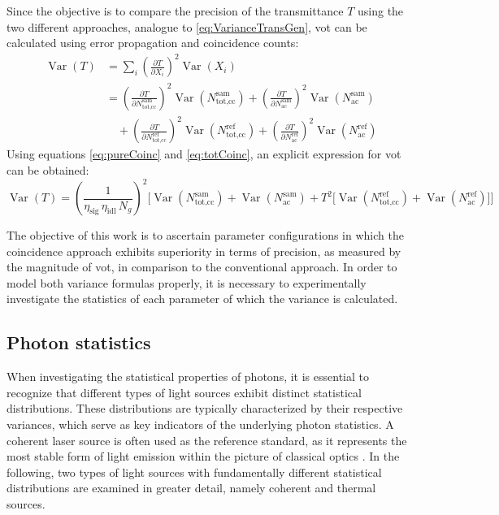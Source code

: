 Since the objective is to compare the precision of the transmittance $T$ using the two different approaches, analogue to \autoref{eq:VarianceTransGen}, \acrshort{vot} can be calculated using error propagation and coincidence counts:
\begin{equation}
	\begin{aligned}
		\operatorname{Var}(T) 
		&= \sum_{i} \left( \frac{\partial T}{\partial X_i} \right)^{2} 
		\operatorname{Var}\!\left(X_i\right) \\[0.5em]
		&= \left( \frac{\partial T}{\partial N_{\text{tot,cc}}^{\text{sam}}} \right)^{2} 
		\operatorname{Var}\!\left(N_{\text{tot,cc}}^{\text{sam}}\right)
		+ \left( \frac{\partial T}{\partial N_{\text{ac}}^{\text{sam}}} \right)^{2} 
		\operatorname{Var}\!\left(N_{\text{ac}}^{\text{sam}}\right) \\[0.5em]
		&\quad + \left( \frac{\partial T}{\partial N_{\text{tot,cc}}^{\text{ref}}} \right)^{2} 
		\operatorname{Var}\!\left(N_{\text{tot,cc}}^{\text{ref}}\right)
		+ \left( \frac{\partial T}{\partial N_{\text{ac}}^{\text{ref}}} \right)^{2} 
		\operatorname{Var}\!\left(N_{\text{ac}}^{\text{ref}}\right)
	\end{aligned}
	\label{eq:VarianceTransGenCoinc}
\end{equation}
Using equations \ref{eq:pureCoinc} and \ref{eq:totCoinc}, an explicit expression for \acrshort{vot} can be obtained:
 \begin{equation}
 	\operatorname{Var}(T) 
 	= \left( \frac{1}{\eta_{\text{sig}}\,\eta_{\text{idl}}\,N_g} \right)^{2}
 	\Bigg[
 	\operatorname{Var}\!\left(N_{\text{tot,cc}}^{\text{sam}}\right) 
 	+ \operatorname{Var}\!\left(N_{\text{ac}}^{\text{sam}}\right) 
 	+ T^{2} \Big[ 
 	\operatorname{Var}\!\left(N_{\text{tot,cc}}^{\text{ref}}\right) 
 	+ \operatorname{Var}\!\left(N_{\text{ac}}^{\text{ref}}\right) 
 	\Big]
 	\Bigg]
 	\label{eq:VarianceTransExplCoinc}
 \end{equation}
 
The objective of this work is to ascertain parameter configurations in which the coincidence approach exhibits superiority in terms of precision, as measured by the magnitude of \acrshort{vot}, in comparison to the conventional approach. In order to model both variance formulas properly, it is necessary to experimentally investigate the statistics of each parameter of which the variance is calculated.
\subsection{Photon statistics}
When investigating the statistical properties of photons, it is essential to recognize that different types of light sources exhibit distinct statistical distributions. These distributions are typically characterized by their respective variances, which serve as key indicators of the underlying photon statistics. A coherent laser source is often used as the reference standard, as it represents the most stable form of light emission within the picture of classical optics \cite{foxQuantumOpticsIntroduction2006}. In the following, two types of light sources with fundamentally different statistical distributions are examined in greater detail, namely coherent and thermal sources.

